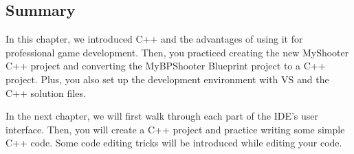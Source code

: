 \documentclass[11pt]{article} %
\begin{document}
\subsection*{Summary}

In this chapter, we introduced C++ and the advantages of using it for professional game development. Then, you practiced creating the new MyShooter C++ project and converting the MyBPShooter Blueprint project to a C++ project. Plus, you also set up the development environment with VS and the C++ solution files.

In the next chapter, we will first walk through each part of the IDE’s user interface. Then, you will create a C++ project and practice writing some simple C++ code. Some code editing tricks will be introduced while editing your code.
\end{document}
